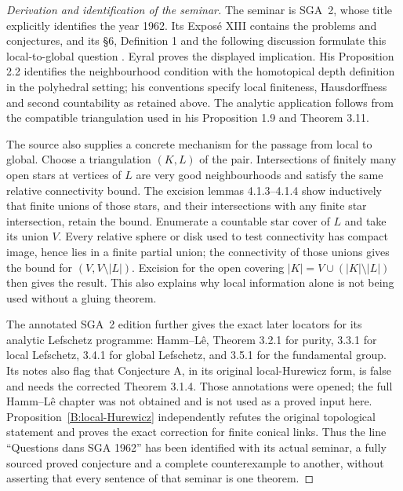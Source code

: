 \begin{proof}[Derivation and identification of the seminar]
The seminar is SGA~2, whose title explicitly identifies the year 1962. Its Expos\'e XIII contains the problems and conjectures, and its \S6, Definition 1 and the following discussion formulate this local-to-global question \cite{BSGA2}. Eyral \cite[Theorem 2.4, p.~828]{BEyral2000} proves the displayed implication. His Proposition 2.2 identifies the neighbourhood condition with the homotopical depth definition in the polyhedral setting; his conventions specify local finiteness, Hausdorffness and second countability as retained above. The analytic application follows from the compatible triangulation used in his Proposition 1.9 and Theorem 3.11.

The source also supplies a concrete mechanism for the passage from local to global. Choose a triangulation $(K,L)$ of the pair. Intersections of finitely many open stars at vertices of $L$ are very good neighbourhoods and satisfy the same relative connectivity bound. The excision lemmas 4.1.3--4.1.4 show inductively that finite unions of those stars, and their intersections with any finite star intersection, retain the bound. Enumerate a countable star cover of $L$ and take its union $V$. Every relative sphere or disk used to test connectivity has compact image, hence lies in a finite partial union; the connectivity of those unions gives the bound for $(V,V\setminus |L|)$. Excision for the open covering $|K|=V\cup(|K|\setminus |L|)$ then gives the result. This also explains why local information alone is not being used without a gluing theorem.

The annotated SGA~2 edition further gives the exact later locators for its analytic Lefschetz programme: Hamm--L\^e, Theorem 3.2.1 for purity, 3.3.1 for local Lefschetz, 3.4.1 for global Lefschetz, and 3.5.1 for the fundamental group. Its notes also flag that Conjecture A, in its original local-Hurewicz form, is false and needs the corrected Theorem 3.1.4. Those annotations were opened; the full Hamm--L\^e chapter was not obtained and is not used as a proved input here. Proposition~\ref{B:local-Hurewicz} independently refutes the original topological statement and proves the exact correction for finite conical links. Thus the line ``Questions dans SGA 1962'' has been identified with its actual seminar, a fully sourced proved conjecture and a complete counterexample to another, without asserting that every sentence of that seminar is one theorem.
\end{proof}

